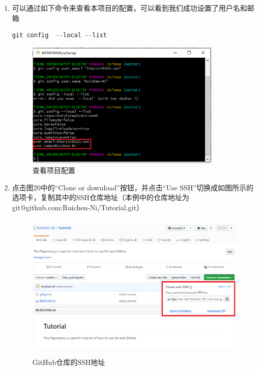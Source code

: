 \documentclass[a4paper,14pt]{article}
\begin{document}
\begin{enumerate}[1. ]
\newpage

\quad

\quad

\quad

\item 可以通过如下命令来查看本项目的配置，可以看到我们成功设置了用户名和邮箱
{\color{red}
\begin{lstlisting}[language=C]
git config  --local --list
\end{lstlisting}
}
\begin{figure}[h]
\centering
\includegraphics[height=6cm]{figure/step3}
\caption{查看项目配置}
\end{figure}

\item 点击图20中的“Clone or download”按钮，并点击“Use SSH”切换成如图所示的选项卡，复制其中的SSH仓库地址（本例中的仓库地址为git@github.com:Ruichen-Ni/Tutorial.git）
\begin{figure}[h]
\centering
\includegraphics[height=7cm]{figure/repository_clone}
\caption{GitHub仓库的SSH地址}
\end{figure}

\newpage

\quad

\quad

\quad


\end{enumerate}
\end{document}
